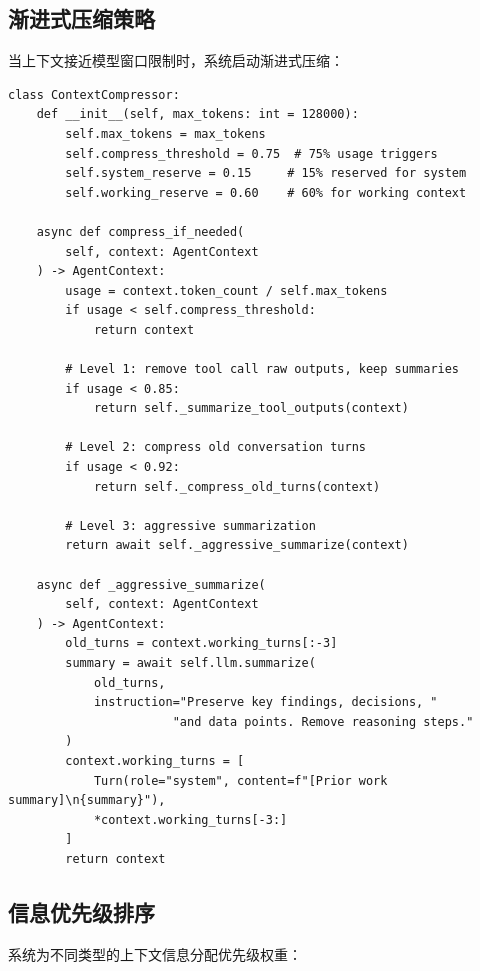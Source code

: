 \documentclass[12pt,a4paper]{ctexrep}
\begin{document}
\subsection{渐进式压缩策略}

当上下文接近模型窗口限制时，系统启动渐进式压缩：

\begin{lstlisting}[language=Python3,caption=上下文压缩策略,label=lst:context-compress]
class ContextCompressor:
    def __init__(self, max_tokens: int = 128000):
        self.max_tokens = max_tokens
        self.compress_threshold = 0.75  # 75% usage triggers
        self.system_reserve = 0.15     # 15% reserved for system
        self.working_reserve = 0.60    # 60% for working context

    async def compress_if_needed(
        self, context: AgentContext
    ) -> AgentContext:
        usage = context.token_count / self.max_tokens
        if usage < self.compress_threshold:
            return context

        # Level 1: remove tool call raw outputs, keep summaries
        if usage < 0.85:
            return self._summarize_tool_outputs(context)

        # Level 2: compress old conversation turns
        if usage < 0.92:
            return self._compress_old_turns(context)

        # Level 3: aggressive summarization
        return await self._aggressive_summarize(context)

    async def _aggressive_summarize(
        self, context: AgentContext
    ) -> AgentContext:
        old_turns = context.working_turns[:-3]
        summary = await self.llm.summarize(
            old_turns,
            instruction="Preserve key findings, decisions, "
                       "and data points. Remove reasoning steps."
        )
        context.working_turns = [
            Turn(role="system", content=f"[Prior work summary]\n{summary}"),
            *context.working_turns[-3:]
        ]
        return context
\end{lstlisting}

\subsection{信息优先级排序}

系统为不同类型的上下文信息分配优先级权重：
\end{document}
